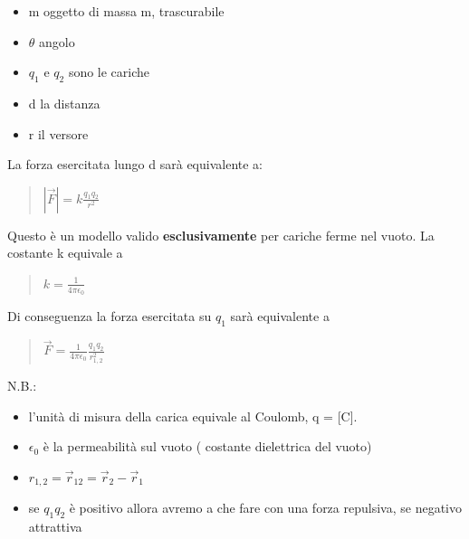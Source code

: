 \documentclass[a4paper, 12pt]{book}
\theoremstyle{plain}
\begin{document}
\begin{itemize}
    \item m oggetto di massa m, trascurabile
    \item \begin{math}
        \theta
    \end{math} angolo
    \item $q_1$ e $q_2$ sono le cariche
    \item d la distanza
    \item r il versore
\end{itemize}

La forza esercitata lungo d sarà equivalente a:
\begin{quote}
    \begin{math}
        |\vec{F}|=k\frac{q_1q_2}{r^2}
    \end{math}
\end{quote}
Questo è un modello valido \textbf{esclusivamente} per cariche ferme nel vuoto. La costante k 
equivale a
\begin{quote}
    \begin{math}
        k=\frac{1}{4\pi\epsilon_0}
    \end{math}
\end{quote}
Di conseguenza la forza esercitata su $q_1$ sarà equivalente a
\begin{quote}
    \begin{math}
        \vec{F}=\frac{1}{4\pi\epsilon_0}\frac{q_1q_2}{r^{2}_{1,2}}
    \end{math}
\end{quote}

N.B.: \begin{itemize}
    \item l'unità di misura della carica equivale al Coulomb, q = [C].
    \item \begin{math}
        \epsilon_0
    \end{math} è la permeabilità sul vuoto (  costante dielettrica del vuoto)
    \item \begin{math}
        r_{1,2} = \vec{r}_{12} = \vec{r}_2 - \vec{r}_1
    \end{math}
    \item se \begin{math}
        q_1q_2
    \end{math} è positivo allora avremo a che fare con una forza repulsiva, se negativo attrattiva
\end{itemize}
\end{document}
